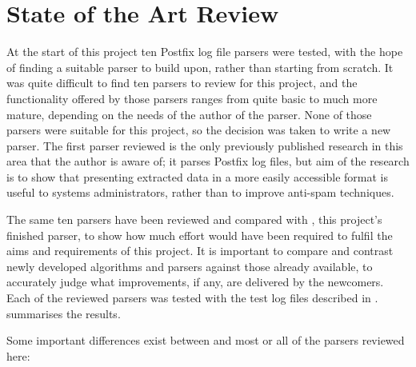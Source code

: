 \chapter{State of the Art Review}

\label{state of the art review}

At the start of this project ten Postfix log file parsers were tested, with
the hope of finding a suitable parser to build upon, rather than starting
from scratch.  It was quite difficult to find ten parsers to review for
this project, and the functionality offered by those parsers ranges from
quite basic to much more mature, depending on the needs of the author of
the parser.  None of those parsers were suitable for this project, so the
decision was taken to write a new parser.  The first parser reviewed is the
only previously published research in this area that the author is aware
of; it parses Postfix log files, but aim of the research is to show that
presenting extracted data in a more easily accessible format is useful to
systems administrators, rather than to improve anti-spam techniques.

The same ten parsers have been reviewed and compared with \parsername{},
this project's finished parser, to show how much effort would have been
required to fulfil the aims and requirements of this project.  It is
important to compare and contrast newly developed algorithms and parsers
against those already available, to accurately judge what improvements, if
any, are delivered by the newcomers.  Each of the reviewed parsers was
tested with the \numberOFlogFILES{} test log files described in
.  
summarises the results.

Some important differences exist between \parsername{} and most or all of
the parsers reviewed here:

